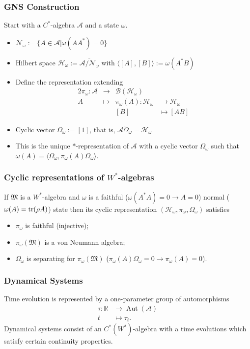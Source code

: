\documentclass{beamer}
\DeclareMathOperator{\Aut}{Aut}
\begin{document}
\begin{frame}
	\frametitle{GNS Construction}
	Start with a $C^*$-algebra $\mathcal{A}$ and a state $\omega$.
	\begin{itemize}
		\item $\mathcal{N}_\omega:=\{A\in\mathcal{A}|\omega(AA^*)=0\}$
		\item Hilbert space $\mathcal{H}_\omega := \overline{\mathcal{A}/\mathcal{N}_\omega}$ with $\langle [A], [B]\rangle := \omega(A^*B)$ 
		\item Define the representation extending
		\begin{alignat*}{2}
			\pi_\omega:\mathcal{A} & \rightarrow &\mathcal{B}(\mathcal{H}_\omega) \\
			A & \mapsto & \pi_\omega(A):\mathcal{H}_\omega & \rightarrow\mathcal{H}_\omega \\
			&& [B] & \mapsto [AB]
		\end{alignat*}
		\item Cyclic vector $\Omega_\omega := [1]$, that is, $\overline{\mathcal{A}\Omega_\omega}=\mathcal{H}_\omega$
		\item This is the unique $*$-representation of $\mathcal{A}$ with a cyclic vector $\Omega_\omega$ such that $\omega(A)=\langle\Omega_\omega,\pi_\omega(A)\Omega_\omega\rangle$.
	\end{itemize}
\end{frame}

\begin{frame}
\frametitle{Cyclic representations of $W^*$-algebras}
\begin{theorem}[$\bigstar$]
If $\mathfrak{M}$ is a $W^*$-algebra and $\omega$ is a faithful ($\omega(A^*A)=0\rightarrow A=0$) normal ($\omega(A)=\tr(\rho A)$) state then its cyclic representation $(\mathcal{H}_\omega,\pi_\omega,\Omega_\omega)$ satisfies
\begin{itemize}
	\item $\pi_\omega$ is faithful (injective);
	\item $\pi_\omega(\mathfrak{M})$ is a von Neumann algebra;
	\item $\Omega_\omega$ is separating for $\pi_\omega(\mathfrak{M})$ ($\pi_\omega(A)\Omega_\omega=0\rightarrow\pi_\omega(A)=0$).
\end{itemize}
\end{theorem}
\end{frame}

\begin{frame}
	\frametitle{Dynamical Systems}
	Time evolution is represented by a one-parameter group of automorphisms
	\begin{align*}
		\tau:\mathbb{R}&\rightarrow\Aut(\mathcal{A}) \\
		t&\mapsto\tau_t.
	\end{align*}
	Dynamical systems consist of an $C^*(W^*)$-algebra with a time evolutions which satisfy certain continuity properties.
\end{frame}
\end{document}
